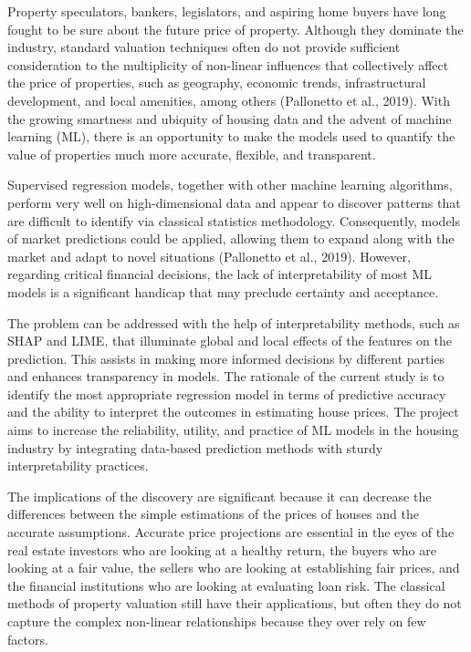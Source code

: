 \documentclass[12pt, a4paper, oneside]{book}
\begin{document}
Property speculators, bankers, legislators, and aspiring home buyers have long fought to be sure about the future price of property. Although they dominate the industry, standard valuation techniques often do not provide sufficient consideration to the multiplicity of non-linear influences that collectively affect the price of properties, such as geography, economic trends, infrastructural development, and local amenities, among others (Pallonetto et al., 2019). With the growing smartness and ubiquity of housing data and the advent of machine learning (ML), there is an opportunity to make the models used to quantify the value of properties much more accurate, flexible, and transparent.


Supervised regression models, together with other machine learning algorithms, perform very well on high-dimensional data and appear to discover patterns that are difficult to identify via classical statistics methodology. Consequently, models of market predictions could be applied, allowing them to expand along with the market and adapt to novel situations (Pallonetto et al., 2019). However, regarding critical financial decisions, the lack of interpretability of most ML models is a significant handicap that may preclude certainty and acceptance.


The problem can be addressed with the help of interpretability methods, such as SHAP and LIME, that illuminate global and local effects of the features on the prediction. This assists in making more informed decisions by different parties and enhances transparency in models. The rationale of the current study is to identify the most appropriate regression model in terms of predictive accuracy and the ability to interpret the outcomes in estimating house prices. The project aims to increase the reliability, utility, and practice of ML models in the housing industry by integrating data-based prediction methods with sturdy interpretability practices.


The implications of the discovery are significant because it can decrease the differences between the simple estimations of the prices of houses and the accurate assumptions. Accurate price projections are essential in the eyes of the real estate investors who are looking at a healthy return, the buyers who are looking at a fair value, the sellers who are looking at establishing fair prices, and the financial institutions who are looking at evaluating loan risk. The classical methods of property valuation still have their applications, but often they do not capture the complex non-linear relationships because they over rely on few factors.
\end{document}
